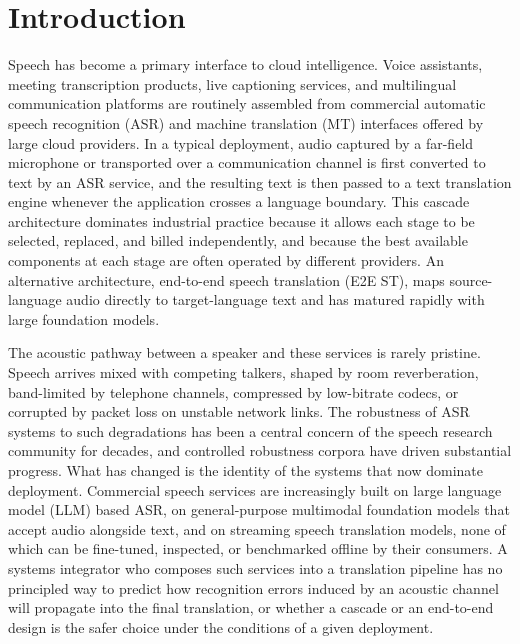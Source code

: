 \section{Introduction}
\label{sec:intro}

Speech has become a primary interface to cloud intelligence. Voice assistants,
meeting transcription products, live captioning services, and multilingual
communication platforms are routinely assembled from commercial automatic
speech recognition (ASR) and machine translation (MT) interfaces offered by
large cloud providers. In a typical deployment, audio captured by a far-field
microphone or transported over a communication channel is first converted to
text by an ASR service, and the resulting text is then passed to a text
translation engine whenever the application crosses a language boundary. This
cascade architecture dominates industrial practice because it allows each
stage to be selected, replaced, and billed independently, and because the best
available components at each stage are often operated by different providers.
An alternative architecture, end-to-end speech translation (E2E ST), maps
source-language audio directly to target-language text and has matured
rapidly with large foundation models.

The acoustic pathway between a speaker and these services is rarely pristine.
Speech arrives mixed with competing talkers, shaped by room reverberation,
band-limited by telephone channels, compressed by low-bitrate codecs, or
corrupted by packet loss on unstable network links. The robustness of ASR
systems to such degradations has been a central concern of the speech research
community for decades, and controlled robustness corpora have driven
substantial progress. What has changed is the identity of the systems that
now dominate deployment. Commercial speech services are increasingly built on
large language model (LLM) based ASR, on general-purpose multimodal foundation
models that accept audio alongside text, and on streaming speech translation
models, none of which can be fine-tuned, inspected, or benchmarked offline by
their consumers. A systems integrator who composes such services into a
translation pipeline has no principled way to predict how recognition errors
induced by an acoustic channel will propagate into the final translation, or
whether a cascade or an end-to-end design is the safer choice under the
conditions of a given deployment.

